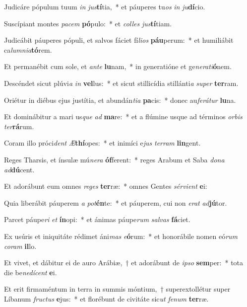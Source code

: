\item Judicáre pópulum tuum \textit{in} \textit{jus}\textbf{tí}tia,~* et páuperes tu\textit{os} \textit{in} \textit{ju}\textbf{dí}cio.
\item Suscípiant montes \textit{pa}\textit{cem} \textbf{pó}pulo:~* et \textit{col}\textit{les} \textit{jus}\textbf{tí}tiam.
\item Judicábit páuperes pópuli, et salvos fáciet fí\textit{li}\textit{os} \textbf{páu}perum:~* et humiliábit ca\textit{lum}\textit{ni}\textit{a}\textbf{tó}rem.
\item Et permanébit cum sole, et \textit{an}\textit{te} \textbf{lu}nam,~* in generatióne et ge\textit{ne}\textit{ra}\textit{ti}\textbf{ó}nem.
\item Descéndet sicut plúvi\textit{a} \textit{in} \textbf{vel}lus:~* et sicut stillicídia stillánti\textit{a} \textit{su}\textit{per} \textbf{ter}ram.
\item Oriétur in diébus ejus justítia, et abundán\textit{ti}\textit{a} \textbf{pa}cis:~* donec au\textit{fe}\textit{rá}\textit{tur} \textbf{lu}na.
\item Et dominábitur a mari us\textit{que} \textit{ad} \textbf{ma}re:~* et a flúmine usque ad términos \textit{or}\textit{bis} \textit{ter}\textbf{rá}rum.
\item Coram illo próci\textit{dent} \textit{Æ}\textbf{thí}opes:~* et inimíci e\textit{jus} \textit{ter}\textit{ram} \textbf{lin}gent.
\item Reges Tharsis, et ínsulæ mú\textit{ne}\textit{ra} \textbf{óf}ferent:~* reges Arabum et Saba \textit{do}\textit{na} \textit{ad}\textbf{dú}cent.
\item Et adorábunt eum omnes \textit{re}\textit{ges} \textbf{ter}ræ:~* omnes Gentes \textit{sér}\textit{vi}\textit{ent} \textbf{e}i:
\item Quia liberábit páuperem \textit{a} \textit{pot}\textbf{én}te:~* et páuperem, cui non \textit{e}\textit{rat} \textit{ad}\textbf{jú}tor.
\item Parcet páupe\textit{ri} \textit{et} \textbf{ín}opi:~* et ánimas páupe\textit{rum} \textit{sal}\textit{vas} \textbf{fá}ciet.
\item Ex usúris et iniquitáte rédimet áni\textit{mas} \textit{e}\textbf{ó}rum:~* et honorábile nomen eó\textit{rum} \textit{co}\textit{ram} \textbf{il}lo.
\item Et vivet, et dábitur ei de auro Arábiæ,~† et adorábunt de \textit{ip}\textit{so} \textbf{sem}per:~* tota die be\textit{ne}\textit{dí}\textit{cent} \textbf{e}i.
\item Et erit firmaméntum in terra in summis móntium,~† superextollétur super Líbanum \textit{fruc}\textit{tus} \textbf{e}jus:~* et florébunt de civitáte sic\textit{ut} \textit{fe}\textit{num} \textbf{ter}ræ.
